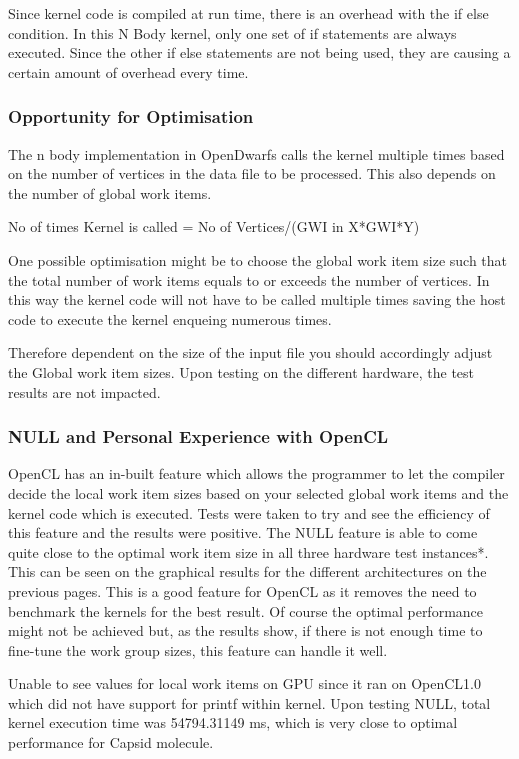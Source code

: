 \par{Since kernel code is compiled at run time, there is an overhead
    with the if else condition. In this N Body kernel, only one set of 
    if statements are always executed. Since the other if else statements 
    are not being used, they are causing a certain amount of overhead 
    every time.}

\subsubsection{Opportunity for Optimisation}
\par{The n body implementation in OpenDwarfs calls the kernel multiple 
    times based on the number of vertices in the data file to be processed. 
    This also depends on the number of global work items.}

\par{No of times Kernel is called = No of Vertices/(GWI in X*GWI*Y)}

\par{One possible optimisation might be to choose the global work 
    item size such that the total number of work items equals 
    to or exceeds the number of vertices. In this way the kernel 
    code will not have to be called multiple times saving the host code to 
    execute the kernel enqueing numerous times.}

\par{Therefore dependent on the size of the input file 
    you should accordingly adjust the Global work item sizes. 
    Upon testing on the different hardware, the test results 
    are not impacted.}

\subsubsection{NULL and Personal Experience with OpenCL}
\par{OpenCL has an in-built feature which allows the programmer to let the 
    compiler decide the local work item sizes based on your selected global 
    work items and the kernel code which is executed. Tests were taken to 
    try and see the efficiency of this feature and the results were positive. 
    The NULL feature is able to come quite close to the optimal work item 
    size in all three hardware test instances*. This can be seen on the 
    graphical results for the different architectures on the previous pages. 
    This is a good feature for OpenCL as it removes the need to benchmark 
    the kernels for the best result. Of course the optimal performance might 
    not be achieved but, as the results show, if there is not enough time to 
    fine-tune the work group sizes, this feature can handle it well.}

\par{Unable to see values for local work items on GPU since it 
    ran on OpenCL1.0 which did not have support for printf 
    within kernel. Upon testing NULL, total kernel execution 
    time was 54794.31149 ms, which is very close to optimal 
    performance for Capsid molecule.}


